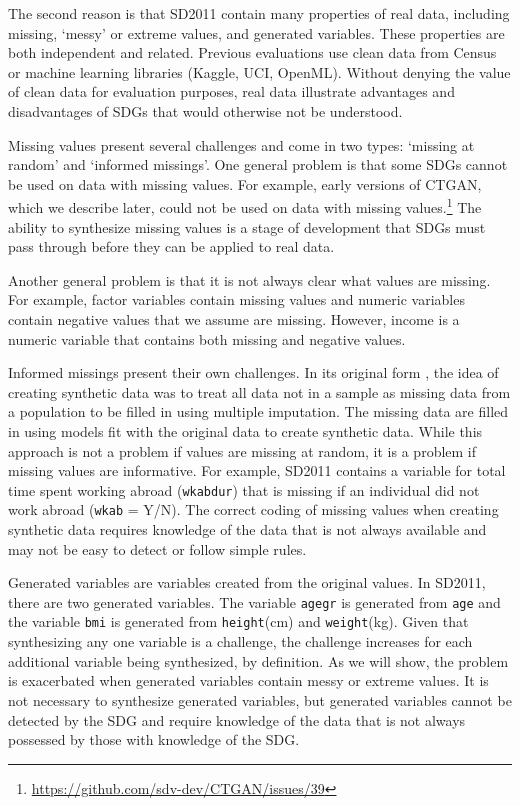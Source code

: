 \documentclass[runningheads]{llncs}
\begin{document}
The second reason is that SD2011 contain many properties of real data, including missing, `messy' or extreme values, and generated variables.  These properties are both independent and related.  Previous evaluations use clean data from Census or machine learning libraries (Kaggle, UCI, OpenML).  Without denying the value of clean data for evaluation purposes, real data illustrate advantages and disadvantages of SDGs that would otherwise not be understood.

Missing values present several challenges and come in two types: `missing at random' and `informed missings'.  One general problem is that some SDGs cannot be used on data with missing values.  For example, early versions of CTGAN, which we describe later, could not be used on data with missing values.\footnote{\url{https://github.com/sdv-dev/CTGAN/issues/39}}  The ability to synthesize missing values is a stage of development that SDGs must pass through before they can be applied to real data.  

Another general problem is that it is not always clear what values are missing.  For example, factor variables contain missing values and numeric variables contain negative values that we assume are missing.  However, income is a numeric variable that contains both missing and negative values.   

Informed missings present their own challenges.  In its original form \cite{rubin1993statistical}, the idea of creating synthetic data was to treat all data not in a sample as missing data from a population to be filled in using multiple imputation.  The missing data are filled in using models fit with the original data to create synthetic data.  While this approach is not a problem if values are missing at random, it is a problem if missing values are informative.  For example, SD2011 contains a variable for total time spent working abroad (\texttt{wkabdur}) that is missing if an individual did not work abroad (\texttt{wkab} = Y/N).  The correct coding of missing values when creating synthetic data requires knowledge of the data that is not always available and may not be easy to detect or follow simple rules.

Generated variables are variables created from the original values.  In SD2011, there are two generated variables.  The variable \texttt{agegr} is generated from \texttt{age} and the variable \texttt{bmi} is generated from \texttt{height}(cm) and \texttt{weight}(kg).  Given that synthesizing any one variable is a challenge, the challenge increases for each additional variable being synthesized, by definition.  As we will show, the problem is exacerbated when generated variables contain messy or extreme values.  It is not necessary to synthesize generated variables, but generated variables cannot be detected by the SDG and require knowledge of the data that is not always possessed by those with knowledge of the SDG.  
\end{document}
